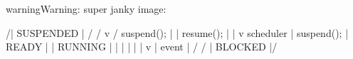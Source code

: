 \documentclass[letterpaper,10pt,english]{sphinxmanual}
\begin{document}
\begin{fulllineitems}
\begin{sphinxadmonition}{warning}{Warning:}
\sphinxAtStartPar
super janky image: 
\begin{sphinxVerbatim}[commandchars=\\\{\}]
                   \PYGZhy{}\PYGZhy{}\PYGZhy{}\PYGZhy{}\PYGZhy{}\PYGZhy{}\PYGZhy{}\PYGZhy{}\PYGZhy{}\PYGZhy{}\PYGZhy{}\PYGZhy{}\PYGZhy{}
    /\PYGZhy{}\PYGZhy{}\PYGZgt{}\PYGZhy{}\PYGZhy{}\PYGZhy{}\PYGZhy{}\PYGZhy{}\PYGZgt{}\PYGZhy{}\PYGZhy{}\PYGZhy{}\PYGZhy{}\PYGZgt{}| SUSPENDED |\PYGZlt{}\PYGZhy{}\PYGZhy{}\PYGZhy{}\PYGZhy{}\PYGZhy{}\PYGZlt{}\PYGZhy{}\PYGZhy{}\PYGZhy{}\PYGZhy{}\PYGZhy{}\PYGZlt{}\PYGZhy{}\PYGZhy{}\PYGZbs{}
   /               \PYGZhy{}\PYGZhy{}\PYGZhy{}\PYGZhy{}\PYGZhy{}\PYGZhy{}\PYGZhy{}\PYGZhy{}\PYGZhy{}\PYGZhy{}\PYGZhy{}\PYGZhy{}\PYGZhy{}                \PYGZbs{}
  /                    \PYGZca{}   v                     \PYGZbs{}
 /          suspend(); |   | resume();            |
|                      \PYGZca{}   v                      \PYGZca{}
\PYGZca{}                    \PYGZhy{}\PYGZhy{}\PYGZhy{}\PYGZhy{}\PYGZhy{}\PYGZhy{}\PYGZhy{}\PYGZhy{}\PYGZhy{}   scheduler   \PYGZhy{}\PYGZhy{}\PYGZhy{}\PYGZhy{}\PYGZhy{}\PYGZhy{}\PYGZhy{}\PYGZhy{}\PYGZhy{}\PYGZhy{}\PYGZhy{}
| suspend();         | READY | \PYGZgt{}\PYGZhy{}\PYGZhy{}\PYGZhy{}\PYGZhy{}\PYGZhy{}\PYGZgt{}\PYGZhy{}\PYGZhy{}\PYGZhy{}\PYGZhy{}\PYGZhy{}\PYGZgt{} | RUNNING |
\PYGZca{}                    |       | \PYGZlt{}\PYGZhy{}\PYGZhy{}\PYGZhy{}\PYGZhy{}\PYGZhy{}\PYGZlt{}\PYGZhy{}\PYGZhy{}\PYGZhy{}\PYGZhy{}\PYGZhy{}\PYGZlt{} |         |
|                    \PYGZhy{}\PYGZhy{}\PYGZhy{}\PYGZhy{}\PYGZhy{}\PYGZhy{}\PYGZhy{}\PYGZhy{}\PYGZhy{}               \PYGZhy{}\PYGZhy{}\PYGZhy{}\PYGZhy{}\PYGZhy{}\PYGZhy{}\PYGZhy{}\PYGZhy{}\PYGZhy{}\PYGZhy{}\PYGZhy{}
 \PYGZbs{}                       \PYGZca{}                        v
  \PYGZbs{}                      | event                  |
   \PYGZbs{}                     \PYGZca{}                       /
    \PYGZbs{}               \PYGZhy{}\PYGZhy{}\PYGZhy{}\PYGZhy{}\PYGZhy{}\PYGZhy{}\PYGZhy{}\PYGZhy{}\PYGZhy{}\PYGZhy{}\PYGZhy{}                 /
     \PYGZbs{}\PYGZlt{}\PYGZhy{}\PYGZhy{}\PYGZhy{}\PYGZhy{}\PYGZhy{}\PYGZlt{}\PYGZhy{}\PYGZhy{}\PYGZhy{}\PYGZhy{}\PYGZhy{}\PYGZlt{}\PYGZhy{}| BLOCKED |\PYGZlt{}\PYGZhy{}\PYGZhy{}\PYGZhy{}\PYGZhy{}\PYGZhy{}\PYGZlt{}\PYGZhy{}\PYGZhy{}\PYGZhy{}\PYGZhy{}\PYGZhy{}\PYGZlt{}\PYGZhy{}\PYGZhy{}\PYGZhy{}/
                    \PYGZhy{}\PYGZhy{}\PYGZhy{}\PYGZhy{}\PYGZhy{}\PYGZhy{}\PYGZhy{}\PYGZhy{}\PYGZhy{}\PYGZhy{}\PYGZhy{}
\end{sphinxVerbatim}


\end{sphinxadmonition}
\end{fulllineitems}
\end{document}
